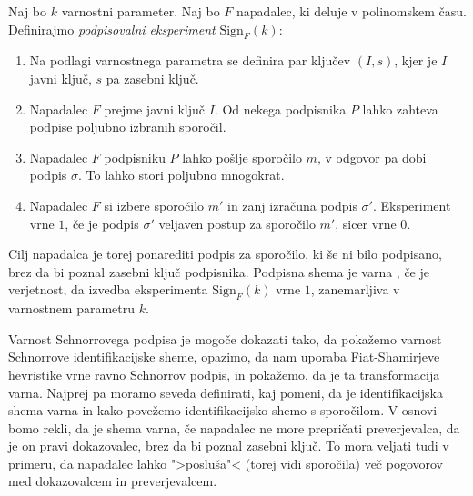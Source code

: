 \begin{definicija}
    Naj bo $k$ varnostni parameter. Naj bo $F$ napadalec, ki deluje v polinomskem času. Definirajmo
    \textit{podpisovalni eksperiment} $\text{Sign}_F(k)$:
    \begin{enumerate}
        \item Na podlagi varnostnega parametra se definira par ključev $(I, s)$, kjer je $I$
            javni ključ, $s$ pa zasebni ključ.
        \item Napadalec $F$ prejme javni ključ $I$. Od nekega podpisnika $P$ lahko zahteva podpise
            poljubno izbranih sporočil.
        \item Napadalec $F$ podpisniku $P$ lahko pošlje sporočilo $m$, v odgovor pa dobi podpis $\sigma$.
            To lahko stori poljubno mnogokrat.
        \item Napadalec $F$ si izbere sporočilo $m'$ in zanj izračuna podpis $\sigma'$. Eksperiment
            vrne $1$, če je podpis $\sigma'$ veljaven postup za sporočilo $m'$, sicer vrne $0$.
    \end{enumerate}
    Cilj napadalca je torej ponarediti podpis za sporočilo, ki še ni bilo podpisano, brez da bi poznal
    zasebni ključ podpisnika. Podpisna shema je varna , če je verjetnost, da izvedba eksperimenta
    $\text{Sign}_F(k)$ vrne $1$, zanemarljiva v varnostnem parametru $k$.
\end{definicija}

Varnost Schnorrovega podpisa je mogoče dokazati tako, da pokažemo varnost Schnorrove identifikacijske
sheme, opazimo, da nam uporaba Fiat-Shamirjeve hevristike vrne ravno Schnorrov podpis, in pokažemo, da
je ta transformacija varna. Najprej pa moramo seveda definirati, kaj pomeni, da je identifikacijska
shema varna in kako povežemo identifikacijsko shemo s sporočilom. V osnovi bomo rekli, da je shema
varna, če napadalec ne more prepričati preverjevalca, da je on pravi dokazovalec, brez da bi poznal
zasebni ključ. To mora veljati tudi v primeru, da napadalec lahko ">posluša"< (torej vidi sporočila)
več pogovorov med dokazovalcem in preverjevalcem.

